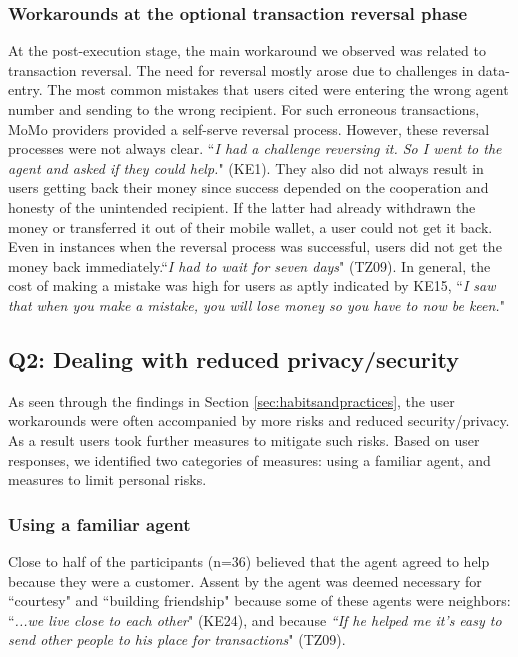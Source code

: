 \subsubsection{Workarounds at the optional transaction reversal phase}
\label{workaroundpostexec}
At the post-execution stage, the main workaround we observed was related to transaction reversal. The need for reversal mostly arose due to challenges in data-entry. The most common mistakes that users cited were entering the wrong agent number and sending to the wrong recipient. For such erroneous transactions, MoMo providers provided a self-serve reversal process. However, these reversal processes were not always clear. ``\textit{I had a challenge reversing it. So I went to the agent and asked if they could help.}" (KE1). They also did not always result in users getting back their money since success depended on the cooperation and honesty of the unintended recipient. If the latter had already withdrawn the money or transferred it out of their mobile wallet, a user could not get it back. Even in instances when the reversal process was successful, users did not get the money back immediately.``\textit{I had to wait for seven days}" (TZ09). In general, the cost of making a mistake was high for users as aptly indicated by KE15, ``\textit{I saw that when you make a mistake, you will lose money so you have to now be keen.}"



\subsection{Q2: Dealing with reduced privacy/security}
\label{sec:enablers}
As seen through the findings in Section \ref{sec:habitsandpractices}, the user workarounds were often accompanied by more risks and reduced security/privacy. As a result users took further measures to mitigate such risks. Based on user responses, we identified two categories of measures:  using a familiar agent, and measures to limit personal risks. 

\subsubsection{Using a familiar agent} 
Close to half of the participants (n=36) believed that the agent agreed to help because they were a customer. Assent by the agent was deemed necessary for ``courtesy" and ``building friendship" because some of these agents were neighbors: ``\textit{...we live close to each other}" (KE24), and because \textit{``If he helped me it’s easy to send other people to his place for transactions}" (TZ09).

